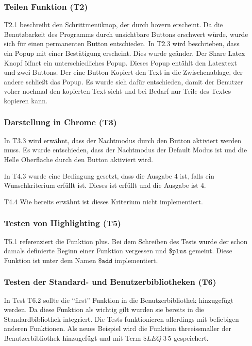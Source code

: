 \documentclass[parskip=full,11pt,twoside]{scrartcl}
\begin{document}
\subsubsection{Teilen Funktion (T2)}
T2.1 beschreibt den Schrittmenüknop, der durch hovern erscheint. Da die Benutzbarkeit
des Programms durch unsichtbare Buttons erschwert würde, wurde sich für einen 
permanenten Button entschieden.
In T2.3 wird beschrieben, dass ein Popup mit einer Bestätigung erscheint.
Dies wurde geänder.
Der Share Latex Knopf öffnet ein unterschiedliches Popup.
Dieses Popup entählt den Latextext und zwei Buttons.
Der eine Button Kopiert den Text in die Zwischenablage, der andere
schließt das Popup.
Es wurde sich dafür entschieden, damit der Benutzer voher nochmal den
kopierten Text sieht und bei Bedarf nur Teile des Textes kopieren kann.

\subsubsection{Darstellung in Chrome (T3)}
In T3.3 wird erwähnt, dass der Nachtmodus durch den Button aktiviert werden muss.
Es wurde entschieden, dass der Nachtmodus der Default Modus ist und die Helle
Oberfläche durch den Button aktiviert wird.

In T4.3 wurde eine Bedingung gesetzt, dass die Ausgabe 4 ist, falls ein Wunschkriterium
erfüllt ist. Dieses ist erfüllt und die Ausgabe ist 4.

T4.4 Wie bereits erwähnt ist dieses Kriterium nicht implementiert.

\subsubsection{Testen von Highlighting (T5)}
T5.1 referenziert die Funktion plus.
Bei dem Schreiben des Tests wurde der schon damals definierte Beginn einer Funktion
vergessen und $\texttt{\$plus}$ gemeint. Diese Funktion ist unter dem Namen $\texttt{\$add} $ 
implementiert.


\subsubsection{Testen der Standard- und Benutzerbibliotheken (T6)}
In Test T6.2 sollte die \enquote{first} Funktion in die Benutzerbibliothek
hinzugefügt werden. Da diese Funktion als wichtig gilt wurden sie bereits 
in die Standardbibliothek integriert. 
Die Tests funktionieren allerdings mit beliebigen anderen Funktionen.
Als neues Beispiel wird die Funktion threeissmaller der Benutzerbibliothek
hinzugefügt und mit Term $\$LEQ \ 3 \ 5$ gespeichert.
\end{document}
